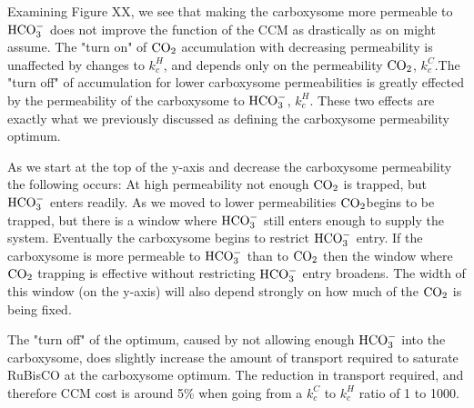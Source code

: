 \documentclass[]{article}
\begin{document}
Examining Figure XX, we see that making the carboxysome more permeable to ${\rm HCO_3^-}$ does not improve the function of the CCM as drastically as on might assume. The "turn on" of ${\rm CO_2}$ accumulation with decreasing permeability is unaffected by changes to $k_c^H$, and depends only on the permeability ${\rm CO_2}$, $k_c^C$.The "turn off" of accumulation for lower carboxysome permeabilities is greatly effected by the permeability of the carboxysome to ${\rm HCO_3^-}$, $k_c^H$. These two effects are exactly what we previously discussed as defining the carboxysome permeability optimum.

As we start at the top of the y-axis and decrease the carboxysome permeability the following occurs: At high permeability not enough ${\rm CO_2}$ is trapped, but ${\rm HCO_3^-}$ enters readily. As we moved to lower permeabilities ${\rm CO_2}$begins to be trapped, but there is a window where ${\rm HCO_3^-}$ still enters enough to supply the system. Eventually the carboxysome begins to restrict ${\rm HCO_3^-}$ entry. If the carboxysome is more permeable to ${\rm HCO_3^-}$ than to ${\rm CO_2}$ then the window where ${\rm CO_2}$ trapping is effective without restricting ${\rm HCO_3^-}$ entry broadens. The width of this window (on the y-axis) will also depend strongly on how much of the ${\rm CO_2}$ is being fixed.

The "turn off" of the optimum, caused by not allowing enough ${\rm HCO_3^-}$ into the carboxysome, does slightly increase the amount of transport required to saturate RuBisCO at the carboxysome optimum. The reduction in transport required, and therefore CCM cost is around 5\% when going from a $k_c^C$ to $k_c^H$ ratio of 1 to 1000.


%
\end{document}
